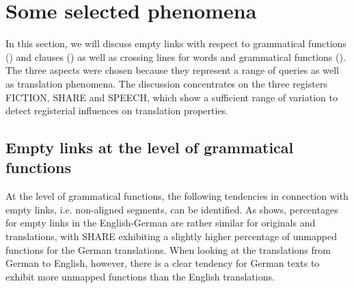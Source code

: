 \documentclass[output=paper]{LSP/langsci}
\begin{document}
\section{Some selected phenomena}\label{sec:culo:4}

In this section, we will discuss empty links with respect to grammatical functions () and clauses () as well as crossing lines for words and grammatical functions (). The three aspects were chosen because they represent a range of queries as well as translation phenomena. The discussion concentrates on the three registers FICTION, SHARE and SPEECH, which show a sufficient range of variation to detect registerial influences on translation properties. 

\subsection{Empty links at the level of grammatical functions}\label{sec:culo:4.1}

At the level of grammatical functions, the following tendencies in connection with empty links, i.e. non-aligned segments, can be identified. As  shows, percentages for empty links in the  English-German are rather similar for originals and translations, with SHARE exhibiting a slightly higher percentage of unmapped functions for the German translations. When looking at the translations from German to English, however, there is a clear tendency for German texts to exhibit more unmapped functions than the English translations. 
\end{document}
